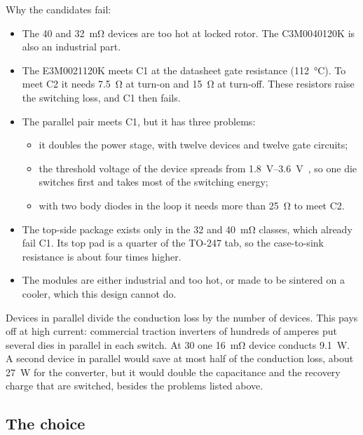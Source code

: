 Why the candidates fail:
\begin{itemize}
  \item The \SI{40}{} and \SI{32}{\milli\ohm} devices are too hot at locked
        rotor. The C3M0040120K is also an industrial part.
  \item The E3M0021120K meets C1 at the datasheet gate resistance
        (\SI{112}{\celsius}). To meet C2 it needs \SI{7.5}{\ohm} at turn-on
        and \SI{15}{\ohm} at turn-off. These resistors raise the switching
        loss, and C1 then fails.
  \item The parallel pair meets C1, but it has three problems:
        \begin{itemize}
          \item it doubles the power stage, with twelve devices and twelve
                gate circuits;
          \item the threshold voltage of the device spreads from
                \SIrange{1.8}{3.6}{\volt}~\cite{wolfspeed_e3m0040}, so one
                die switches first and takes most of the switching energy;
          \item with two body diodes in the loop it needs more than
                \SI{25}{\ohm} to meet C2.
        \end{itemize}
  \item The top-side package exists only in the \SI{32}{} and
        \SI{40}{\milli\ohm} classes, which already fail C1. Its top pad is a
        quarter of the TO-247 tab, so the case-to-sink resistance is about
        four times higher.
  \item The modules are either industrial and too hot, or made to be
        sintered on a cooler, which this design cannot do.
\end{itemize}
Devices in parallel divide the conduction loss by the number of devices.
This pays off at high current: commercial traction inverters of hundreds of
amperes put several dies in parallel in each switch. At \SI{30}{\Arms} one
\SI{16}{\milli\ohm} device conducts \SI{9.1}{\watt}. A second device in
parallel would save at most half of the conduction loss, about
\SI{27}{\watt} for the converter, but it would double the capacitance and
the recovery charge that are switched, besides the problems listed above.

\subsection{The choice}

